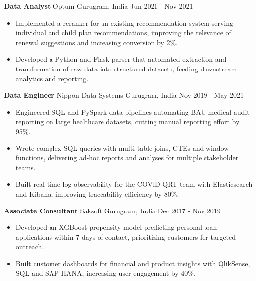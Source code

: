 \documentclass[10pt,a4paper]{article}
\newcommand{\role}[4]{\textbf{#1} \textbar{} #2 \hfill #3 \textbar{} #4\par}
\begin{document}
\vspace{3pt}
\role{Data Analyst}{Optum}{Gurugram, India}{Jun 2021 - Nov 2021}
\begin{itemize}
  \item Implemented a reranker for an existing recommendation system serving individual and child plan recommendations, improving the relevance of renewal suggestions and increasing conversion by 2\%.
  \item Developed a Python and Flask parser that automated extraction and transformation of raw data into structured datasets, feeding downstream analytics and reporting.
\end{itemize}
\vspace{3pt}
\role{Data Engineer}{Nippon Data Systems}{Gurugram, India}{Nov 2019 - May 2021}
\begin{itemize}
  \item Engineered SQL and PySpark data pipelines automating BAU medical-audit reporting on large healthcare datasets, cutting manual reporting effort by 95\%.
  \item Wrote complex SQL queries with multi-table joins, CTEs and window functions, delivering ad-hoc reports and analyses for multiple stakeholder teams.
  \item Built real-time log observability for the COVID QRT team with Elasticsearch and Kibana, improving traceability efficiency by 80\%.
\end{itemize}
\vspace{3pt}
\role{Associate Consultant}{Saksoft}{Gurugram, India}{Dec 2017 - Nov 2019}
\begin{itemize}
  \item Developed an XGBoost propensity model predicting personal-loan applications within 7 days of contact, prioritizing customers for targeted outreach.
  \item Built customer dashboards for financial and product insights with QlikSense, SQL and SAP HANA, increasing user engagement by 40\%.
\end{itemize}
\end{document}
